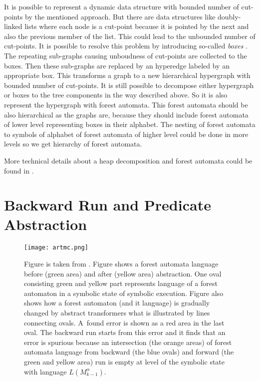 \documentclass[fleqn,11pt]{ExcelAtFIT} %
\begin{document}
It is possible to represent a dynamic data structure with bounded number of cut-points by the mentioned approach.
But there are data structures like doubly-linked lists where each node is a cut-point because
it is pointed by the next and also the previous member of the list.
This could lead to the unbounded number of cut-points.
It is possible to resolve this problem by introducing so-called \emph{boxes} \cite{forester13}.
The repeating sub-graphs causing unboudness of cut-points are collected to the boxes.
Then these sub-graphs are replaced by an hyperedge labeled by an appropriate box.
This transforms a graph to a new hierarchical hypergraph with bounded number of cut-points.
It is still possible to decompose either hypergraph or boxes to the tree components in the way
described above.
So it is also represent the hypergraph with forest automata.
This forest automata should be also hierarchical as the graphs are, because they
should include forest automata of lower level representing boxes in their alphabet.
The nesting of forest automata to symbols of alphabet of forest automata of higher level
could be done in more levels so we get hierarchy of forest automata.

More technical details about a heap decomposition and forest automata could be found in \cite{forester11, forester13}.

\section{Backward Run and Predicate Abstraction}
\label{sec:br}

\begin{figure}[t]
	\centering
	\texttt{[image: artmc.png]}
	\caption{
		Figure is taken from \cite{artmc}.
		Figure shows a forest automata language before (green area)
		and after (yellow area) abstraction.
		One oval consisting green and yellow part represents
		language of a forest automaton in a symbolic state of symbolic execution.
		Figure also shows how a forest automaton (and it language) is gradually changed
		by abstract transformers what is illustrated by lines connecting ovals.
		A~found error is shown as a red area in the last oval.
		The backward run starts from this error and it finds
		that an error is spurious because an intersection (the orange areas) of forest automata language from backward (the blue ovals)
		and forward (the green and yellow area) run is empty at level of the symbolic state with language $L(M^{\alpha}_{k-1})$.}
	\label{fig:bwrun}
\end{figure}
\end{document}
